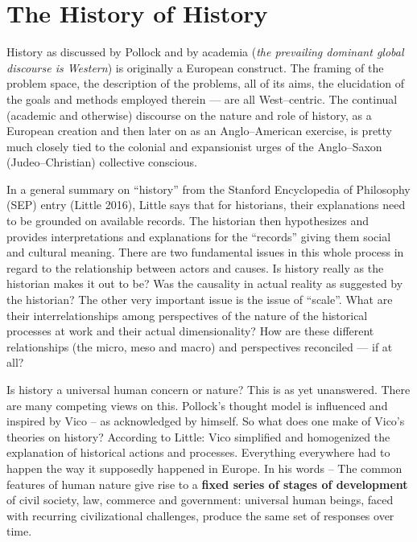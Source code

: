 \section*{The History of History}

\vskip -5pt

History as discussed by Pollock and by academia (\textit{the prevailing dominant global discourse is Western}) is originally a European construct. The framing of the problem space, the description of the problems, all of its aims, the elucidation of the goals and methods employed therein — are all West–centric. The continual (academic and otherwise) discourse on the nature and role of history, as a European creation and then later on as an Anglo–American exercise, is pretty much closely tied to the colonial and expansionist urges of the Anglo–Saxon (Judeo–Christian) collective conscious.

In a general summary on “history” from the Stanford Encyclopedia of Philosophy (SEP) entry (Little 2016), Little says that for historians, their explanations need to be grounded on available records. The historian then hypothesizes and provides interpretations and explanations for the “records” giving them social and cultural meaning. There are two fundamental issues in this whole process in regard to the relationship between actors and causes. Is history really as the historian makes it out to be? Was the causality in actual reality as suggested by the historian? The other very important issue is the issue of “scale”. What are their interrelationships among perspectives of the nature of the historical processes at work and their actual dimensionality? How are these different relationships (the micro, meso and macro) and perspectives reconciled — if at all?

Is history a universal human concern or nature? This is as yet unanswered. There are many competing views on this. Pollock’s thought model is influenced and inspired by Vico – as acknowledged by himself. So what does one make of Vico’s theories on history? According to Little: Vico simplified and homogenized the explanation of historical actions and processes. Everything everywhere had to happen the way it supposedly happened in Europe. In his words – The common features of human nature give rise to a \textbf{fixed series of stages of development} of civil society, law, commerce and government: universal human beings, faced with recurring civilizational challenges, produce the same set of responses over time.

